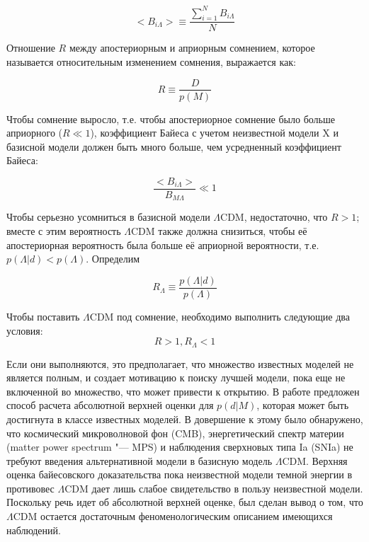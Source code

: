 \begin{equation}
<B_{i\Lambda}> \equiv \frac{\sum_{i=1}^N B_{i\Lambda}}{N}
\end{equation}

Отношение $R$  между апостериорным и априорным сомнением, которое называется относительным изменением сомнения, 
выражается как:

\begin{equation}
R \equiv \frac{D}{p(M)}
\end{equation}

Чтобы сомнение выросло, т.е. чтобы апостериорное сомнение было больше априорного ($R \ll 1$), коэффициент Байеса 
с учетом неизвестной модели X и базисной модели должен быть много больше, чем усредненный коэффициент Байеса:

\begin{equation}
\frac{<B_{i\Lambda}>}{B_{M\Lambda}} \ll 1
\end{equation}

Чтобы серьезно усомниться в базисной модели $\Lambda$CDM, недостаточно, что $R > 1$; вместе с этим вероятность 
$\Lambda$CDM также должна снизиться, чтобы её апостериорная вероятность была больше её априорной вероятности, т.е. 
$p(\Lambda|d) < p(\Lambda)$. Определим

\begin{equation}
R_\Lambda \equiv \frac{p(\Lambda|d)}{p(\Lambda)}
\end{equation}

Чтобы поставить $\Lambda$CDM под сомнение, необходимо выполнить следующие два условия:
\begin{equation}
R > 1, R_\Lambda < 1
\end{equation}

Если они выполняются, это предполагает, что множество известных моделей не является полным, и создает мотивацию к 
поиску лучшей модели, пока еще не включенной во множество, что может привести к открытию. В работе 
\cite{starkman2008introducing} предложен способ расчета абсолютной верхней оценки для $p(d|M)$, которая может быть 
достигнута в классе известных моделей. В довершение к этому было обнаружено, что космический микроволновой фон (CMB), 
энергетический спектр материи (matter power spectrum "--- MPS) и наблюдения сверхновых типа Ia (SNIa) не требуют 
введения альтернативной модели в базисную модель $\Lambda$CDM. Верхняя оценка байесовского доказательства пока 
неизвестной модели темной энергии в противовес $\Lambda$CDM дает лишь слабое свидетельство в пользу неизвестной модели. 
Поскольку речь идет об абсолютной верхней оценке, был сделан вывод о том, что $\Lambda$CDM остается достаточным 
феноменологическим описанием имеющихся наблюдений.

